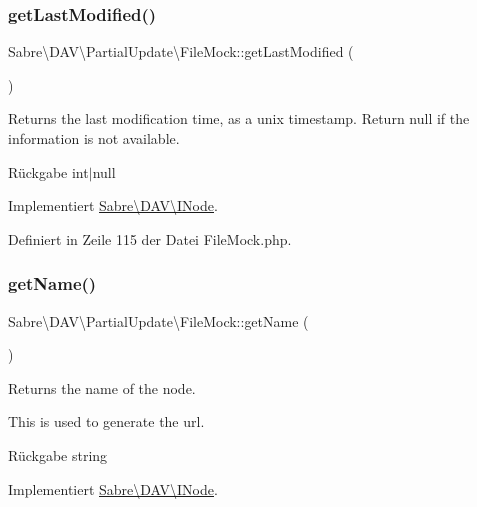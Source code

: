 \subsubsection{\texorpdfstring{get\+Last\+Modified()}{getLastModified()}}
{\footnotesize\ttfamily Sabre\textbackslash{}\+D\+A\+V\textbackslash{}\+Partial\+Update\textbackslash{}\+File\+Mock\+::get\+Last\+Modified (\begin{DoxyParamCaption}{ }\end{DoxyParamCaption})}

Returns the last modification time, as a unix timestamp. Return null if the information is not available.

\begin{DoxyReturn}{Rückgabe}
int$\vert$null 
\end{DoxyReturn}


Implementiert \mbox{\hyperlink{interface_sabre_1_1_d_a_v_1_1_i_node_a06335f81c7d4ec2c6d9e327c8ce61014}{Sabre\textbackslash{}\+D\+A\+V\textbackslash{}\+I\+Node}}.



Definiert in Zeile 115 der Datei File\+Mock.\+php.

\mbox{\label{class_sabre_1_1_d_a_v_1_1_partial_update_1_1_file_mock_a9f6898974521e0424de1078d6e2a9096}} 
\subsubsection{\texorpdfstring{get\+Name()}{getName()}}
{\footnotesize\ttfamily Sabre\textbackslash{}\+D\+A\+V\textbackslash{}\+Partial\+Update\textbackslash{}\+File\+Mock\+::get\+Name (\begin{DoxyParamCaption}{ }\end{DoxyParamCaption})}

Returns the name of the node.

This is used to generate the url.

\begin{DoxyReturn}{Rückgabe}
string 
\end{DoxyReturn}


Implementiert \mbox{\hyperlink{interface_sabre_1_1_d_a_v_1_1_i_node_ab616fe836b1ae36af12126a2bc934dce}{Sabre\textbackslash{}\+D\+A\+V\textbackslash{}\+I\+Node}}.



